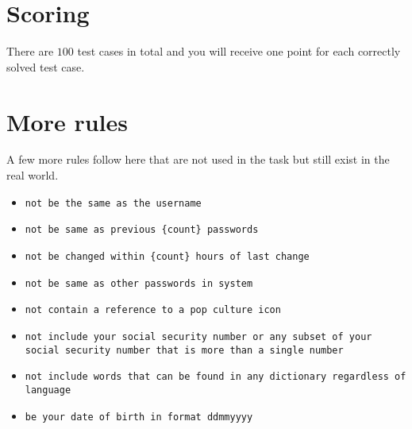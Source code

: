 \section*{Scoring}
There are $100$ test cases in total and you will receive one point for each correctly solved test case.

\section*{More rules}
A few more rules follow here that are not used in the task but still exist in the real world.
\begin{itemize}
    \item \texttt{not be the same as the username}
    \item \texttt{not be same as previous \{count\} passwords}
    \item \texttt{not be changed within \{count\} hours of last change}
    \item \texttt{not be same as other passwords in system}
    \item \texttt{not contain a reference to a pop culture icon}
    \item \texttt{not include your social security number or any subset of your social security number that is more than a single number}
    \item \texttt{not include words that can be found in any dictionary regardless of language}
    \item \texttt{be your date of birth in format ddmmyyyy}
\end{itemize}
